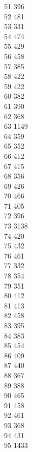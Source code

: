 { 51	396 \\
 52	481 \\
 53	331 \\
 54	474 \\
 55	429 \\
 56	458 \\
 57	385 \\
 58	422 \\
 59	422 \\
 60	382 \\
 61	390 \\
 62	368 \\
 63	1149 \\
 64	359 \\
 65	352 \\
 66	412 \\
 67	415 \\
 68	356 \\
 69	426 \\
 70	466 \\
 71	405 \\
 72	396 \\
 73	3138 \\
 74	420 \\
 75	432 \\
 76	461 \\
 77	332 \\
 78	354 \\
 79	351 \\
 80	412 \\
 81	413 \\
 82	458 \\
 83	395 \\
 84	383 \\
 85	454 \\
 86	409 \\
 87	440 \\
 88	367 \\
 89	388 \\
 90	465 \\
 91	458 \\
 92	461 \\
 93	368 \\
 94	431 \\
 95	1433 \\
}
